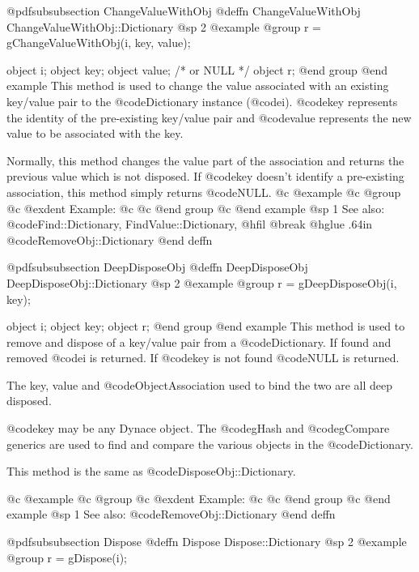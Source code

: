 @pdfsubsubsection {ChangeValueWithObj}
@deffn {ChangeValueWithObj} ChangeValueWithObj::Dictionary
@sp 2
@example
@group
r = gChangeValueWithObj(i, key, value);

object  i;
object  key;
object  value;    /*  or NULL   */
object  r;
@end group
@end example
This method is used to change the value associated with an existing
key/value pair to the @code{Dictionary} instance (@code{i}).
@code{key} represents the identity of the pre-existing key/value
pair and @code{value} represents the new value to be associated with
the key.

Normally, this method changes the value part of the association
and returns the previous value which is not disposed.  If
@code{key} doesn't identify a pre-existing association, this method
simply returns @code{NULL}.
@c @example
@c @group
@c @exdent Example:
@c 
@c @end group
@c @end example
@sp 1
See also:  @code{Find::Dictionary, FindValue::Dictionary,}
@hfil @break @hglue .64in      @code{RemoveObj::Dictionary}
@end deffn












@pdfsubsubsection {DeepDisposeObj}
@deffn {DeepDisposeObj} DeepDisposeObj::Dictionary
@sp 2
@example
@group
r = gDeepDisposeObj(i, key);

object  i;
object  key;
object  r;
@end group
@end example
This method is used to remove and dispose of a key/value pair from a
@code{Dictionary}.  If found and removed @code{i} is returned.  If @code{key}
is not found @code{NULL} is returned.

The key, value and @code{ObjectAssociation} used to bind the two are all deep
disposed.

@code{key} may be any Dynace object.  The @code{gHash} and
@code{gCompare} generics are used to find and compare the various
objects in the @code{Dictionary}.

This method is the same as @code{DisposeObj::Dictionary}.

@c @example
@c @group
@c @exdent Example:
@c 
@c @end group
@c @end example
@sp 1
See also:  @code{RemoveObj::Dictionary}
@end deffn











@pdfsubsubsection {Dispose}
@deffn {Dispose} Dispose::Dictionary
@sp 2
@example
@group
r = gDispose(i);

